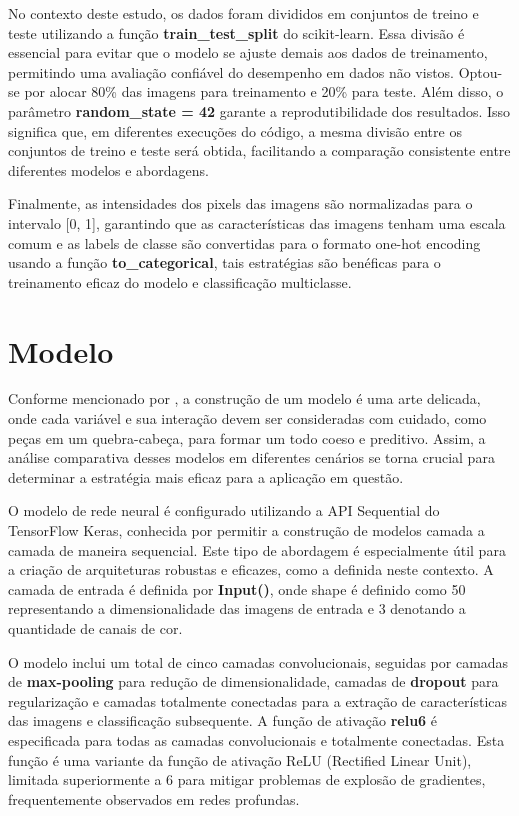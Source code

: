 No contexto deste estudo, os dados foram divididos em conjuntos de treino e teste utilizando a função \textbf{train\_test\_split} do scikit-learn. Essa divisão é essencial para evitar que o modelo se ajuste demais aos dados de treinamento, permitindo uma avaliação confiável do desempenho em dados não vistos. Optou-se por alocar 80\% das imagens para treinamento e 20\% para teste. Além disso, o parâmetro \textbf{random\_state = 42} garante a reprodutibilidade dos resultados. Isso significa que, em diferentes execuções do código, a mesma divisão entre os conjuntos de treino e teste será obtida, facilitando a comparação consistente entre diferentes modelos e abordagens.

Finalmente, as intensidades dos pixels das imagens são normalizadas para o intervalo [0, 1], garantindo que as características das imagens tenham uma escala comum e as labels de classe são convertidas para o formato one-hot encoding usando a função \textbf{to\_categorical}, tais estratégias são benéficas para o treinamento eficaz do modelo e classificação multiclasse.



\section{Modelo}

Conforme mencionado por \cite{geetha}, a construção de um modelo é uma arte delicada, onde cada variável e sua interação devem ser consideradas com cuidado, como peças em um quebra-cabeça, para formar um todo coeso e preditivo. Assim, a análise comparativa desses modelos em diferentes cenários se torna crucial para determinar a estratégia mais eficaz para a aplicação em questão.

O modelo de rede neural é configurado utilizando a API Sequential do TensorFlow Keras, conhecida por permitir a construção de modelos camada a camada de maneira sequencial. Este tipo de abordagem é especialmente útil para a criação de arquiteturas robustas e eficazes, como a definida neste contexto. A camada de entrada é definida por \textbf{Input()}, onde shape é definido como 50 representando a dimensionalidade das imagens de entrada e 3 denotando a quantidade de canais de cor.

O modelo inclui um total de cinco camadas convolucionais, seguidas por camadas de \textbf{max-pooling} para redução de dimensionalidade, camadas de \textbf{dropout} para regularização e camadas totalmente conectadas para a extração de características das imagens e classificação subsequente. A função de ativação \textbf{relu6} é especificada para todas as camadas convolucionais e totalmente conectadas. Esta função é uma variante da função de ativação ReLU (Rectified Linear Unit), limitada superiormente a 6 para mitigar problemas de explosão de gradientes, frequentemente observados em redes profundas.

